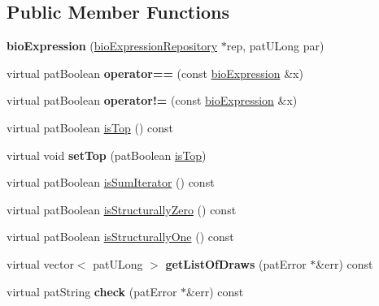\subsection*{Public Member Functions}
\begin{DoxyCompactItemize}
\item 
\mbox{\label{classbio_expression_a59af60871f9d47f7650ccd2c1ec365e5}} 
{\bfseries bio\+Expression} (\hyperlink{classbio_expression_repository}{bio\+Expression\+Repository} $\ast$rep, pat\+U\+Long par)
\item 
\mbox{\label{classbio_expression_ab44daf45ecf956d19cf2beb05fef61d8}} 
virtual pat\+Boolean {\bfseries operator==} (const \hyperlink{classbio_expression}{bio\+Expression} \&x)
\item 
\mbox{\label{classbio_expression_af5186de5d3f396023a6e931ed316fe56}} 
virtual pat\+Boolean {\bfseries operator!=} (const \hyperlink{classbio_expression}{bio\+Expression} \&x)
\item 
virtual pat\+Boolean \hyperlink{classbio_expression_a95a481610d93746accf6c294c4f4d5d4}{is\+Top} () const
\item 
\mbox{\label{classbio_expression_ad69eb9a5244dea20138c3a2a4430707e}} 
virtual void {\bfseries set\+Top} (pat\+Boolean \hyperlink{classbio_expression_a95a481610d93746accf6c294c4f4d5d4}{is\+Top})
\item 
virtual pat\+Boolean \hyperlink{classbio_expression_aee422b6c10811d2478972c83300acbb0}{is\+Sum\+Iterator} () const
\item 
virtual pat\+Boolean \hyperlink{classbio_expression_a264c6d78671610ada8261d698e4c4c42}{is\+Structurally\+Zero} () const
\item 
virtual pat\+Boolean \hyperlink{classbio_expression_a754b37dd7a3e0bb943c23ed8ebd48eaa}{is\+Structurally\+One} () const
\item 
\mbox{\label{classbio_expression_a58eb7741926db74527f406313c573789}} 
virtual vector$<$ pat\+U\+Long $>$ {\bfseries get\+List\+Of\+Draws} (pat\+Error $\ast$\&err) const
\item 
\mbox{\label{classbio_expression_ab0298bdb3ea8c3add547c0a9b799c969}} 
virtual pat\+String {\bfseries check} (pat\+Error $\ast$\&err) const

\end{DoxyCompactItemize}
